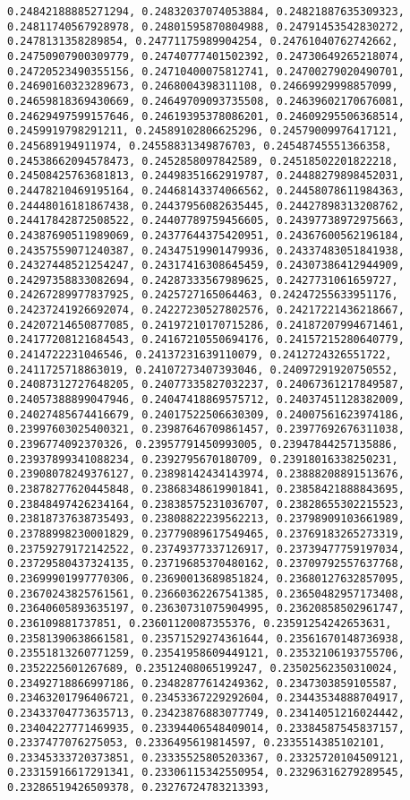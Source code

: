 \documentclass[11pt]{article}
\begin{document}
\begin{Verbatim}[commandchars=\\\{\}]
0.24842188885271294, 0.24832037074053884, 0.24821887635309323, 0.24811740567928978, 0.24801595870804988, 0.24791453542830272, 0.2478131358289854, 0.24771175989904254, 0.24761040762742662, 0.24750907900309779, 0.24740777401502392, 0.24730649265218074, 0.24720523490355156, 0.24710400075812741, 0.24700279020490701, 0.24690160323289673, 0.2468004398311108, 0.24669929998857099, 0.24659818369430669, 0.24649709093735508, 0.24639602170676081, 0.24629497599157646, 0.24619395378086201, 0.24609295506368514, 0.2459919798291211, 0.24589102806625296, 0.24579009976417121, 0.245689194911974, 0.24558831349876703, 0.24548745551366358, 0.24538662094578473, 0.2452858097842589, 0.24518502201822218, 0.24508425763681813, 0.24498351662919787, 0.24488279898452031, 0.24478210469195164, 0.24468143374066562, 0.24458078611984363, 0.24448016181867438, 0.24437956082635445, 0.24427898313208762, 0.24417842872508522, 0.24407789759456605, 0.24397738972975663, 0.24387690511989069, 0.24377644375420951, 0.24367600562196184, 0.24357559071240387, 0.24347519901479936, 0.24337483051841938, 0.24327448521254247, 0.24317416308645459, 0.24307386412944909, 0.24297358833082694, 0.24287333567989625, 0.2427731061659727, 0.24267289977837925, 0.2425727165064463, 0.24247255633951176, 0.24237241926692074, 0.24227230527802576, 0.24217221436218667, 0.24207214650877085, 0.24197210170715286, 0.24187207994671461, 0.24177208121684543, 0.24167210550694176, 0.24157215280640779, 0.2414722231046546, 0.24137231639110079, 0.2412724326551722, 0.2411725718863019, 0.24107273407393046, 0.24097291920750552, 0.24087312727648205, 0.24077335827032237, 0.24067361217849587, 0.24057388899047946, 0.24047418869575712, 0.24037451128382009, 0.24027485674416679, 0.24017522506630309, 0.24007561623974186, 0.23997603025400321, 0.23987646709861457, 0.23977692676311038, 0.2396774092370326, 0.23957791450993005, 0.23947844257135886, 0.23937899341088234, 0.2392795670180709, 0.23918016338250231, 0.23908078249376127, 0.23898142434143974, 0.23888208891513676, 0.23878277620445848, 0.23868348619901841, 0.23858421888843695, 0.23848497426234164, 0.23838575231036707, 0.23828655302215523, 0.23818737638735493, 0.23808822239562213, 0.23798909103661989, 0.23788998230001829, 0.23779089617549465, 0.23769183265273319, 0.23759279172142522, 0.23749377337126917, 0.23739477759197034, 0.23729580437324135, 0.23719685370480162, 0.23709792557637768, 0.23699901997770306, 0.23690013689851824, 0.23680127632857095, 0.23670243825761561, 0.23660362267541385, 0.23650482957173408, 0.23640605893635197, 0.23630731075904995, 0.23620858502961747, 0.236109881737851, 0.23601120087355376, 0.23591254242653631, 0.23581390638661581, 0.23571529274361644, 0.23561670148736938, 0.23551813260771259, 0.23541958609449121, 0.23532106193755706, 0.2352225601267689, 0.23512408065199247, 0.23502562350310024, 0.23492718866997186, 0.23482877614249362, 0.2347303859105587, 0.23463201796406721, 0.23453367229292604, 0.23443534888704917, 0.23433704773635713, 0.23423876883077749, 0.23414051216024442, 0.23404227771469935, 0.23394406548409014, 0.23384587545837157, 0.2337477076275053, 0.2336495619814597, 0.2335514385102101, 0.23345333720373851, 0.23335525805203367, 0.23325720104509121, 0.23315916617291341, 0.23306115342550954, 0.23296316279289545, 0.23286519426509378, 0.23276724783213393, 
\end{Verbatim}
\end{document}
